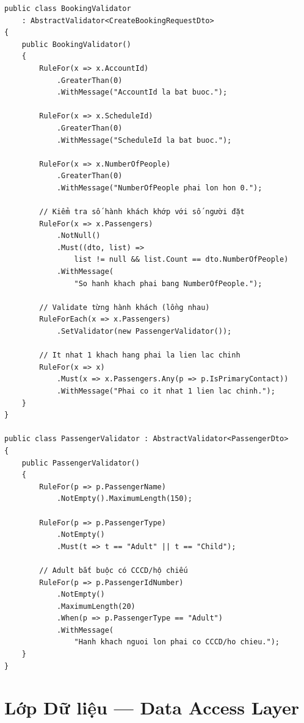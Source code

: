 \begin{lstlisting}[style=csharp,
  caption={BookingValidator với FluentValidation lồng nhau},
  label={lst:validator}]
public class BookingValidator
    : AbstractValidator<CreateBookingRequestDto>
{
    public BookingValidator()
    {
        RuleFor(x => x.AccountId)
            .GreaterThan(0)
            .WithMessage("AccountId la bat buoc.");

        RuleFor(x => x.ScheduleId)
            .GreaterThan(0)
            .WithMessage("ScheduleId la bat buoc.");

        RuleFor(x => x.NumberOfPeople)
            .GreaterThan(0)
            .WithMessage("NumberOfPeople phai lon hon 0.");

        // Kiểm tra số hành khách khớp với số người đặt
        RuleFor(x => x.Passengers)
            .NotNull()
            .Must((dto, list) =>
                list != null && list.Count == dto.NumberOfPeople)
            .WithMessage(
                "So hanh khach phai bang NumberOfPeople.");

        // Validate từng hành khách (lồng nhau)
        RuleForEach(x => x.Passengers)
            .SetValidator(new PassengerValidator());

        // It nhat 1 khach hang phai la lien lac chinh
        RuleFor(x => x)
            .Must(x => x.Passengers.Any(p => p.IsPrimaryContact))
            .WithMessage("Phai co it nhat 1 lien lac chinh.");
    }
}

public class PassengerValidator : AbstractValidator<PassengerDto>
{
    public PassengerValidator()
    {
        RuleFor(p => p.PassengerName)
            .NotEmpty().MaximumLength(150);

        RuleFor(p => p.PassengerType)
            .NotEmpty()
            .Must(t => t == "Adult" || t == "Child");

        // Adult bắt buộc có CCCD/hộ chiếu
        RuleFor(p => p.PassengerIdNumber)
            .NotEmpty()
            .MaximumLength(20)
            .When(p => p.PassengerType == "Adult")
            .WithMessage(
                "Hanh khach nguoi lon phai co CCCD/ho chieu.");
    }
}
\end{lstlisting}

\section{Lớp Dữ liệu — Data Access Layer}\label{Sec3.4}

